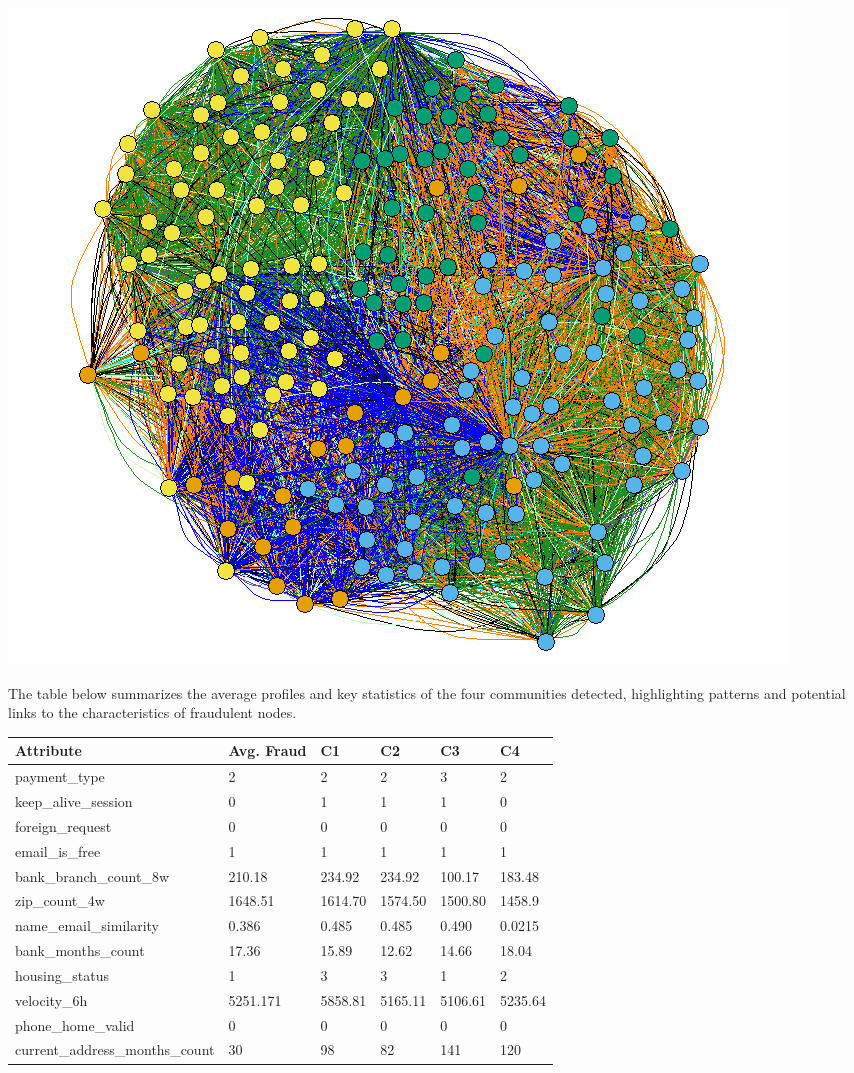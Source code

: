 \documentclass{styles/svproc}
\begin{document}
\begin{center}
\includegraphics[scale=0.43]{q2comm}  
\end{center}

\bigskip
\noindent The table below summarizes the average profiles and key statistics of the four communities detected, highlighting patterns and potential links to the characteristics of fraudulent nodes.

\bigskip
\noindent
\begin{tabular}{ | m{4.7cm} | m{1.8cm}| m{1.25cm}| m{1.25cm}| m{1.25cm}| m{1.25cm}|} 
  \hline
  \textbf{Attribute} & \textbf{Avg. Fraud} & \textbf{C1} & \textbf{C2} & \textbf{C3} & \textbf{C4}\\ 
  \hline
  payment\_type & 2 & 2 & 2 & 3 & 2 \\ 
  \hline
  keep\_alive\_session & 0 & 1 & 1 & 1 & 0 \\ 
  \hline
  foreign\_request & 0 & 0 & 0 & 0 & 0 \\
  \hline
  email\_is\_free & 1 & 1 & 1 & 1 & 1 \\
  \hline
  bank\_branch\_count\_8w & 210.18 & 234.92 & 234.92 & 100.17 & 183.48 \\
  \hline
  zip\_count\_4w & 1648.51 & 1614.70 & 1574.50 & 1500.80 & 1458.9 \\
  \hline
  name\_email\_similarity & 0.386 & 0.485 & 0.485 & 0.490 & 0.0215 \\
  \hline
  bank\_months\_count & 17.36 & 15.89 & 12.62 & 14.66 & 18.04 \\
  \hline
  housing\_status & 1 & 3 & 3 & 1 & 2 \\
  \hline
  velocity\_6h & 5251.171 & 5858.81 & 5165.11 & 5106.61 & 5235.64 \\
  \hline
  phone\_home\_valid & 0 & 0 & 0 & 0 & 0 \\
  \hline
  current\_address\_months\_count & 30 & 98 & 82 & 141 & 120 \\
  \hline
\end{tabular}
\end{document}
